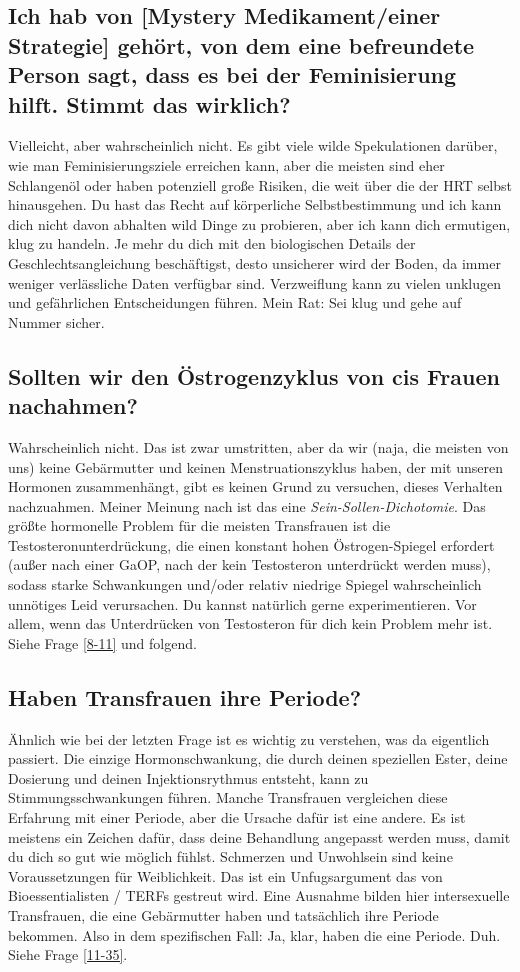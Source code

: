 \documentclass{article}
\begin{document}
\subsection{Ich hab von [Mystery Medikament/einer Strategie] gehört, von dem eine befreundete Person sagt, dass es bei der Feminisierung hilft. Stimmt das wirklich?}

Vielleicht, aber wahrscheinlich nicht. Es gibt viele wilde Spekulationen darüber, wie man Feminisierungsziele erreichen kann, aber die meisten sind eher Schlangenöl oder haben potenziell große Risiken, die weit über die der HRT selbst hinausgehen. Du hast das Recht auf körperliche Selbstbestimmung und ich kann dich nicht davon abhalten wild Dinge zu probieren, aber ich kann dich ermutigen, klug zu handeln. Je mehr du dich mit den biologischen Details der Geschlechtsangleichung beschäftigst, desto unsicherer wird der Boden, da immer weniger verlässliche Daten verfügbar sind. Verzweiflung kann zu vielen unklugen und gefährlichen Entscheidungen führen. Mein Rat: Sei klug und gehe auf Nummer sicher.

\subsection{Sollten wir den Östrogenzyklus von cis Frauen nachahmen?}\label{11-10}

Wahrscheinlich nicht. Das ist zwar umstritten, aber da wir (naja, die meisten von uns) keine Gebärmutter und keinen Menstruationszyklus haben, der mit unseren Hormonen zusammenhängt, gibt es keinen Grund zu versuchen, dieses Verhalten nachzuahmen. Meiner Meinung nach ist das eine \textit{Sein-Sollen-Dichotomie}. Das größte hormonelle Problem für die meisten Transfrauen ist die Testosteronunterdrückung, die einen konstant hohen Östrogen-Spiegel erfordert (außer nach einer GaOP, nach der kein Testosteron unterdrückt werden muss), sodass starke Schwankungen und/oder relativ niedrige Spiegel wahrscheinlich unnötiges Leid verursachen. Du kannst natürlich gerne experimentieren. Vor allem, wenn das Unterdrücken von Testosteron für dich kein Problem mehr ist. Siehe Frage \ref{8-11} und folgend.

\subsection{Haben Transfrauen ihre Periode?}

Ähnlich wie bei der letzten Frage ist es wichtig zu verstehen, was da eigentlich passiert. Die einzige Hormonschwankung, die durch deinen speziellen Ester, deine Dosierung und deinen Injektionsrythmus entsteht, kann zu Stimmungsschwankungen führen. Manche Transfrauen vergleichen diese Erfahrung mit einer Periode, aber die Ursache dafür ist eine andere. Es ist meistens ein Zeichen dafür, dass deine Behandlung angepasst werden muss, damit du dich so gut wie möglich fühlst. Schmerzen und Unwohlsein sind keine Voraussetzungen für Weiblichkeit. Das ist ein Unfugsargument das von Bioessentialisten / TERFs gestreut wird. Eine Ausnahme bilden hier intersexuelle Transfrauen, die eine Gebärmutter haben und tatsächlich ihre Periode bekommen. Also in dem spezifischen Fall: Ja, klar, haben die eine Periode. Duh. Siehe Frage \ref{11-35}.
\end{document}
